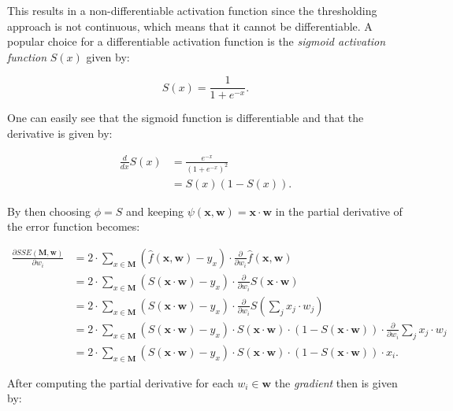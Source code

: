This results in a non-differentiable activation function since the thresholding approach is not continuous, which means that it cannot be differentiable.
A popular choice for a differentiable activation function is the \textit{sigmoid activation function} $S(x)$ given by:

\begin{equation}
    S(x) = \frac{1}{1 + e^{-x}}.
\end{equation}

One can easily see that the sigmoid function is differentiable and that the derivative is given by:

\begin{equation}
    \begin{split}
        \frac{d}{dx} S(x)
        &= \frac{e^{-x}}{(1 + e^{-x})^2} \\
        &= S(x)(1 - S(x)).
    \end{split}
\end{equation}

By then choosing $\phi = S$ and keeping $\psi(\bm{x}, \bm{w}) = \bm{x} \cdot \bm{w}$ in  the partial derivative of the error function becomes:

\begin{equation}
    \label{eq:error-derivative-2}
    \begin{split}
        \frac{\partial SSE(\bm{M}, \bm{w})}{\partial w_i}
        &= 2 \cdot \sum_{x \in \bm{M}} (\hat{f}(\bm{x},\bm{w}) - y_x) \cdot  \frac{\partial }{\partial w_i} \hat{f}(\bm{x}, \bm{w}) \\
        &= 2 \cdot \sum_{x \in \bm{M}} (S(\bm{x} \cdot \bm{w}) - y_x) \cdot  \frac{\partial }{\partial w_i} S(\bm{x} \cdot \bm{w}) \\
        &= 2 \cdot \sum_{x \in \bm{M}} (S(\bm{x} \cdot \bm{w}) - y_x) \cdot  \frac{\partial }{\partial w_i} S \left(\sum_j x_j \cdot w_j \right) \\
        &= 2 \cdot \sum_{x \in \bm{M}} (S(\bm{x} \cdot \bm{w}) - y_x) \cdot  S(\bm{x} \cdot \bm{w}) \cdot (1-S(\bm{x} \cdot \bm{w})) \cdot \frac{\partial }{\partial w_i} \sum_j x_j \cdot w_j \\
        &= 2 \cdot \sum_{x \in \bm{M}} (S(\bm{x} \cdot \bm{w}) - y_x) \cdot  S(\bm{x} \cdot \bm{w}) \cdot (1-S(\bm{x} \cdot \bm{w}))\cdot x_i.
    \end{split}
\end{equation}

After computing the partial derivative for each $w_i \in \bm{w}$ the \textit{gradient} then is given by:

